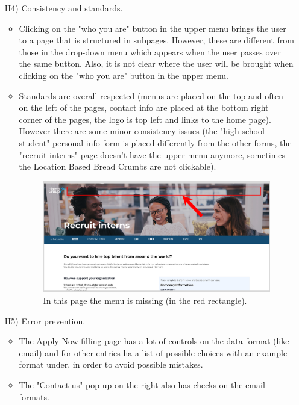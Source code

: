 \documentclass[11pt, letterpaper]{article}
\begin{document}
\begin{enumerate}
\begin{itemize}
        \end{itemize}
        \item[H4)] Consistency and standards.
            \begin{itemize}
                \item Clicking on the "who you are" button in the upper menu brings the user to a page that is structured in subpages. However, these are different from those in the drop-down menu which appears when the user passes over the same button. Also, it is not clear where the user will be brought when clicking on the "who you are" button in the upper menu.
                \item Standards are overall respected (menus are placed on the top and often on the left of the pages, contact info are placed at the bottom right corner of the pages, the logo is top left and links to the home page). However there are some minor consistency issues (the "high school student" personal info form is placed differently from the other forms, the "recruit interns" page doesn't have the upper menu anymore, sometimes the Location Based Bread Crumbs are not clickable).
                \begin{figure}[H]
                    \centering
                    \includegraphics[width=10cm]{images/inspection/H4_1.png}
                    \caption{In this page the menu is missing (in the red rectangle).}
                \end{figure}
            \end{itemize}
        \item[H5)] Error prevention.
            \begin{itemize}
                \item The Apply Now filling page has a lot of controls on the data format (like email) and for other entries ha a list of possible choices with an example format under, in order to avoid possible mistakes.
                \item The "Contact us" pop up on the right also has checks on the email formats.

\end{itemize}
\end{enumerate}
\end{document}
